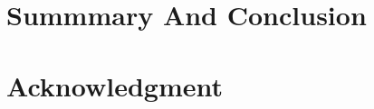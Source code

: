 \documentclass[10pt, conference, compsocconf]{IEEEtran}
\begin{document}
		
	
	\section{Summmary And Conclusion}


	
	\section*{Acknowledgment}
	
	
	
	
	
\end{document}

